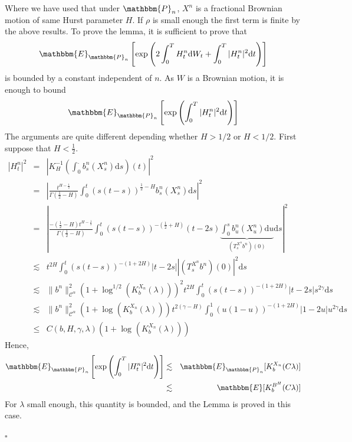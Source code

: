\documentclass[a4paper,11pt]{article}
\newcommand{\mathd}{\mathrm{d}}
\newenvironment{proof}{{\sc Proof.}}{\hfill$\square$}
\newcommand{\CC}{\mathscr C}
\begin{document}
\begin{proof}
  
  Where we have used that under $\mathbbm{P}_{n}$, $X^{n}$ is a fractional
  Brownian motion of same Hurst parameter $H$. If $\rho$ is small enough the
  first term is finite by the above results. To prove the lemma, it is
  sufficient to prove that
  \[ \mathbbm{E}_{\mathbbm{P}_{n}} \left[ \exp   \left( 2 \int_{0}^{T}
     H^{n}_{t} \mathd W_{t} + \int_{0}^{T} | H^{n}_{t} |^{2} \mathd t \right)
     \right] \]
  is bounded by a constant independent of $n$. As $W$ is a Brownian motion, it
  is enough to bound
  \[ \mathbbm{E}_{\mathbbm{P}_{n}} \left[ \exp   \left( \int_{0}^{T} |
     H_{t}^{n} |^{2} \mathd t \right) \right] \]
  The arguments are quite different depending whether $H>1/2$ or $H<1/2$.
  First suppose that $H< \frac{1}{2}$.
  \begin{eqnarray*}
    |H_{t}^{n} |^{2} & = & \left\lvert K_{H}^{-1} \left( \int_{0}^{.} b^{n}_{s}
    (X^{n}_{s} ) \mathd s \right) (t) \right\lvert^{2}\\
    & = & \left\lvert \frac{t^{H- \frac{1}{2}}}{\Gamma ( \frac{1}{2} -H)} 
    \int_{0}^{t} (s(t-s))^{\frac{1}{2} -H} b^{n}_{s} (X^{n}_{s} ) \mathd s
    \right\lvert^{2}\\
    & = & \left\lvert \frac{- \left( \frac{1}{2} -H \right) t^{H-
    \frac{1}{2}}}{\Gamma ( \frac{1}{2} -H)}  \int_{0}^{t} (s(t-s))^{-(
    \frac{1}{2} +H)} (t-2s) \underbrace{\int_{0}^{s} b^{n}_{u} (X^{n}_{u} )
    \mathd u}_{( T_{s}^{X^{n}} b^{n} ) (0)} \mathd s \right\lvert^{2}\\
    & \lesssim & t^{2H}  \int_{0}^{t} (s(t-s))^{- (1+2H)}  | t-2s | | (
    T_{s}^{X^{n}} b^{n} ) (0) |^{2} \mathd s\\
    & \lesssim & \|b^{n} \|_{\CC^{\alpha}}^{2} ( 1+ \log^{1/2} (
    K^{X_{n}}_{b} ( \lambda ) ) )^{2} t^{2H}  \int_{0}^{t} (s(t-s))^{- (1+2H)}
    | t-2s | s^{2 \gamma} \mathd s\\
    & \lesssim & \|b^{n} \|_{\CC^{\alpha}}^{2} ( 1+ \log^{} ( K^{X_{n}}_{b} (
    \lambda ) ) )^{} t^{2 ( \gamma -H)}  \int_{0}^{1} (u(1-u))^{- (1+2H)}  |
    1-2u | u^{2 \gamma} \mathd s\\
    & \leqslant & C (b,H, \gamma , \lambda ) ( 1+ \log^{} ( K^{X_{n}}_{b} (
    \lambda ) ) )
  \end{eqnarray*}
  Hence,
  \begin{eqnarray*}
    \mathbbm{E}_{\mathbbm{P}_{n}} \left[ \exp   \left( \int_{0}^{T} |
    H_{t}^{n} |^{2} \mathd t \right) \right] & \lesssim &
    \mathbbm{E}_{\mathbbm{P}_{n}} [ K^{X_{n}}_{b} ( C \lambda ) ]\\
    & \lesssim & \mathbbm{E} [  K^{B^{H}}_{b} ( C \lambda ) ]
  \end{eqnarray*}
  For $\lambda$ small enough, this quantity is bounded, and the Lemma is
  proved in this case.
  

\end{proof}
\end{document}
